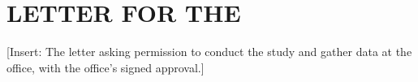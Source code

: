\chapter{LETTER FOR THE \OfficeName}
[Insert: The letter asking permission to conduct the study and gather data at the office, with the office's signed approval.]
